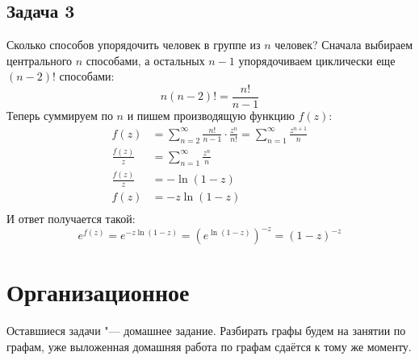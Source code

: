 \subsection{Задача 3}
	Сколько способов упорядочить человек в группе из $n$ человек?
	Сначала выбираем центрального $n$ способами, а остальных $n-1$ упорядочиваем циклически
	еще $(n-2)!$ способами:
	\[ n(n-2)! = \frac{n!}{n-1} \]
	Теперь суммируем по $n$ и пишем производящую функцию $f(z)$:
	\begin{align*}
		f(z) &=
			\sum_{n=2}^\infty \frac{n!}{n-1} \cdot \frac{z^n}{n!} =
			\sum_{n=1}^\infty \frac{z^{n+1}}{n} \\
		\frac{f(z)}{z} &=
			\sum_{n=1}^\infty \frac{z^n}{n} \\
		\frac{f(z)}{z} &= -\ln (1 - z) \\
		f(z) &= -z\ln (1 - z) \\
	\end{align*}
	И ответ получается такой:
	\[
		e^{f(z)} = e^{-z\ln (1-z)} = \left(e^{\ln(1-z)}\right)^{-z} = (1-z)^{-z}
	\]

\section{Организационное}
	Оставшиеся задачи "--- домашнее задание.
	Разбирать графы будем на занятии по графам, уже выложенная
	домашняя работа по графам сдаётся к тому же моменту.
